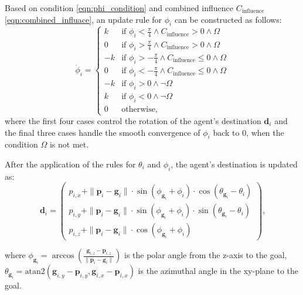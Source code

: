         Based on condition \eqref{eqn:phi_condition} and combined influence $C_{\text{influence}}$ \eqref{eqn:combined_influace}, an update rule for $\phi_i$ can be constructed as follows:
        \begin{equation}
            \label{eqn:phi_update}
            \dot{\phi}_i = 
            \begin{cases}
                k  & \text{if } \phi_i < \frac{\pi}{4} \land C_{\text{influence}} > 0 \land \Omega \\
                0  & \text{if } \phi_i > \frac{\pi}{4} \land C_{\text{influence}} > 0 \land \Omega \\
                -k & \text{if } \phi_i > -\frac{\pi}{4} \land C_{\text{influence}} \leq 0 \land \Omega \\
                0  & \text{if } \phi_i < -\frac{\pi}{4} \land C_{\text{influence}} \leq 0 \land \Omega \\
                -k & \text{if } \phi_i > 0 \land \neg \Omega \\
                k  & \text{if } \phi_i < 0 \land \neg \Omega \\
                0  & \text{otherwise}\text{,}
            \end{cases}
        \end{equation}
        where the first four cases control the rotation of the agent's destination $\mathbf{d}_i$ and the final three cases handle the smooth convergence of $\phi_i$ back to 0, when the condition $\Omega$ is not met. 

        After the application of the rules for $\theta_i$ and $\phi_i$, the agent's destination is updated as:
        \begin{equation}
            \label{eqn:destination_update}
            \mathbf{d}_i =
            \begin{pmatrix}
                p_{i,x} +  \|\mathbf{p}_i - \mathbf{g}_i\| \cdot \sin(\phi_{\mathbf{g}_i} + \phi_i) \cdot \cos(\theta_{\mathbf{g}_i} - \theta_i) \\
                p_{i,y} + \|\mathbf{p}_i - \mathbf{g}_i\| \cdot \sin(\phi_{\mathbf{g}_i} + \phi_i) \cdot \sin(\theta_{\mathbf{g}_i} - \theta_i) \\
                p_{i,z} + \|\mathbf{p}_i - \mathbf{g}_i\| \cdot \cos(\phi_{\mathbf{g}_i} + \phi_i)
            \end{pmatrix}\text{,}
        \end{equation}

        where $\phi_{\mathbf{g}_i} = \arccos(\frac{\mathbf{g}_{i,z} - \mathbf{p}_{i,z}}{\|\mathbf{p}_i - \mathbf{g}_i\|})$ is the polar angle from the z-axis to the goal, 
        $\theta_{\mathbf{g}_i} = \text{atan2}( \mathbf{g}_{i,y} - \mathbf{p}_{i,y}, \mathbf{g}_{i,x} - \mathbf{p}_{i,x})$ is the azimuthal angle in the xy-plane to the goal.
    
